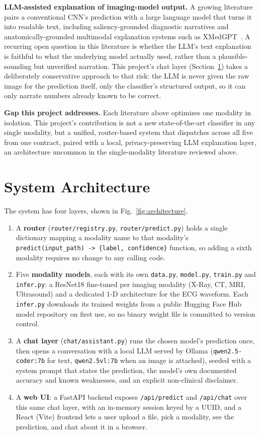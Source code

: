 \documentclass[conference]{IEEEtran}
\begin{document}
\textbf{LLM-assisted explanation of imaging-model output.} A growing literature pairs a conventional CNN's prediction with a large language model that turns it into readable text, including saliency-grounded diagnostic narratives and anatomically-grounded multimodal explanation systems such as XMedGPT~\cite{xmedgpt}. A recurring open question in this literature is whether the LLM's text explanation is faithful to what the underlying model actually used, rather than a plausible-sounding but unverified narration. This project's chat layer (Section~\ref{sec:architecture}) takes a deliberately conservative approach to that risk: the LLM is never given the raw image for the prediction itself, only the classifier's structured output, so it can only narrate numbers already known to be correct.

\textbf{Gap this project addresses.} Each literature above optimizes one modality in isolation. This project's contribution is not a new state-of-the-art classifier in any single modality, but a unified, router-based system that dispatches across all five from one contract, paired with a local, privacy-preserving LLM explanation layer, an architecture uncommon in the single-modality literature reviewed above.

\section{System Architecture}
\label{sec:architecture}

The system has four layers, shown in Fig.~\ref{fig:architecture}.

\begin{enumerate}
\item A \textbf{router} (\texttt{router/registry.py}, \texttt{router/predict.py}) holds a single dictionary mapping a modality name to that modality's \texttt{predict(input\_path) -> \{label, confidence\}} function, so adding a sixth modality requires no change to any calling code.
\item Five \textbf{modality models}, each with its own \texttt{data.py}, \texttt{model.py}, \texttt{train.py} and \texttt{infer.py}: a ResNet18 fine-tuned per imaging modality (X-Ray, CT, MRI, Ultrasound) and a dedicated 1-D architecture for the ECG waveform. Each \texttt{infer.py} downloads its trained weights from a public Hugging Face Hub model repository on first use, so no binary weight file is committed to version control.
\item A \textbf{chat layer} (\texttt{chat/assistant.py}) runs the chosen model's prediction once, then opens a conversation with a local LLM served by Ollama (\texttt{qwen2.5-coder:7b} for text, \texttt{qwen2.5vl:7b} when an image is attached), seeded with a system prompt that states the prediction, the model's own documented accuracy and known weaknesses, and an explicit non-clinical disclaimer.
\item A \textbf{web UI}: a FastAPI backend exposes \texttt{/api/predict} and \texttt{/api/chat} over this same chat layer, with an in-memory session keyed by a UUID, and a React (Vite) frontend lets a user upload a file, pick a modality, see the prediction, and chat about it in a browser.
\end{enumerate}
\end{document}
